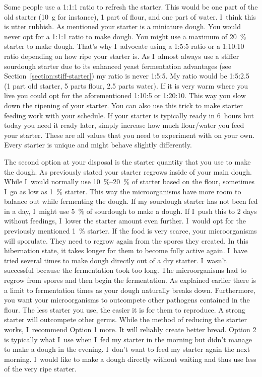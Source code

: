 Some people use a 1:1:1 ratio to refresh the starter. This would
be one part of the old starter (\qty{10}{\gram} for instance), 1 part of flour,
and one part of water. I~think this is utter rubbish. As mentioned
your starter is a miniature dough. You would never opt for a 1:1:1 ratio to
make dough. You might use a maximum of \qty{20}{\percent} starter to
make dough. That's why I~advocate using a 1:5:5 ratio or a
1:10:10 ratio depending on how ripe your starter is. As I~almost
always use a stiffer sourdough starter due to its enhanced
yeast fermentation advantages (see Section~\ref{section:stiff-starter})
my ratio is never 1:5:5. My ratio would be 1:5:2.5 (1 part old starter,
5 parts flour, 2.5 parts water). If it is very warm where you live
you could opt for the aforementioned 1:10:5 or 1:20:10. This
way you slow down the ripening of your starter. You can also use this
trick to make starter feeding work with your schedule.
If your starter is typically ready in 6~hours but today you need it
ready later, simply increase how much flour/water you feed your starter.
These are all values that you need to experiment with on your own.
Every starter is unique and might behave slightly differently.

The second option at your disposal is the starter quantity that
you use to make the dough. As previously stated your starter
regrows inside of your main dough. While I~would normally use
\qtyrange{10}{20}{\percent} of starter based on the flour, sometimes I~go
as low as \qty{1}{\percent} starter. This way the microorganisms have
more room to balance out while fermenting the dough. If my sourdough
starter has not been fed in a day, I~might use \qty{5}{\percent} of sourdough
to make a dough. If I~push this to 2 days without feedings,
I~lower the starter amount even further. I~would opt for the
previously mentioned \qty{1}{\percent} starter. If the food is very scarce,
your microorganisms will sporulate. They need to regrow again
from the spores they created. In this hibernation state, it takes
longer for them to become fully active again. I~have tried
several times to make dough directly out of a dry starter.
I~wasn't successful because the fermentation took too long.
The microorganisms had to regrow from spores and then begin
the fermentation. As explained earlier there is a limit to
fermentation times as your dough naturally breaks down.
Furthermore, you want your microorganisms to outcompete
other pathogens contained in the flour. The less starter
you use, the easier it is for them to reproduce. A strong
starter will outcompete other germs. While the method of
reducing the starter works, I~recommend Option 1 more.
It will reliably create better bread. Option 2 is typically
what I~use when I~fed my starter in the morning but didn't
manage to make a dough in the evening. I~don't want to feed
my starter again the next morning. I~would like to make a dough
directly without waiting and thus use less of the very ripe starter.

